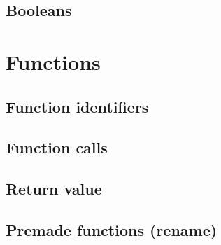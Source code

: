 \subsection{Booleans}

\section{Functions}
\subsection{Function identifiers}

\subsection{Function calls}

\subsection{Return value}

\subsection{Premade functions (rename)}

%


